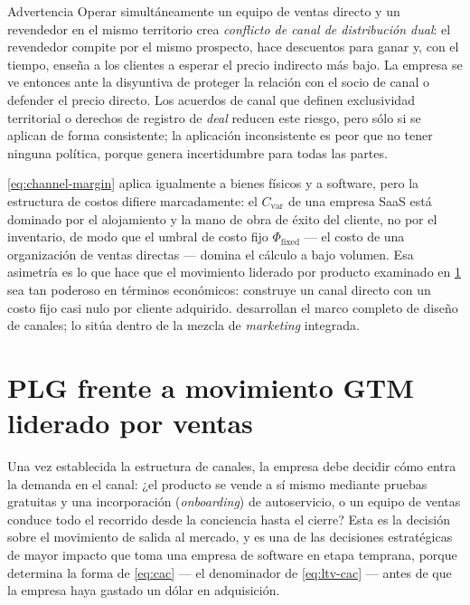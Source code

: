 \begin{admonition}{Advertencia}
Operar simultáneamente un equipo de ventas directo y un revendedor en el mismo territorio crea
\textit{conflicto de canal de distribución dual}: el revendedor compite por el mismo prospecto,
hace descuentos para ganar y, con el tiempo, enseña a los clientes a esperar el precio indirecto
más bajo. La empresa se ve entonces ante la disyuntiva de proteger la relación con el socio de
canal o defender el precio directo. Los acuerdos de canal que definen exclusividad territorial o
derechos de registro de \emph{deal} reducen este riesgo, pero sólo si se aplican de forma
consistente; la aplicación inconsistente es peor que no tener ninguna política, porque genera
incertidumbre para todas las partes.
\end{admonition}

\cref{eq:channel-margin} aplica igualmente a bienes físicos y a software, pero la estructura de
costos difiere marcadamente: el \(C_{\text{var}}\) de una empresa SaaS está dominado por el
alojamiento y la mano de obra de éxito del cliente, no por el inventario, de modo que el umbral
de costo fijo \(\Phi_{\text{fixed}}\) --- el costo de una organización de ventas directas ---
domina el cálculo a bajo volumen. Esa asimetría es lo que hace que el movimiento liderado por
producto examinado en \cref{sec:gtm-motion} sea tan poderoso en términos económicos: construye
un canal directo con un costo fijo casi nulo por cliente adquirido. \textcite{coughlan2006marketing}
desarrollan el marco completo de diseño de canales; \textcite{kotler2021} lo sitúa dentro de la
mezcla de \emph{marketing} integrada.


\section{PLG frente a movimiento GTM liderado por ventas}\label{sec:gtm-motion}

Una vez establecida la estructura de canales, la empresa debe decidir cómo entra la demanda en el
canal: ¿el producto se vende a sí mismo mediante pruebas gratuitas y una incorporación
(\emph{onboarding}) de autoservicio, o un equipo de ventas conduce todo el recorrido desde la
conciencia hasta el cierre? Esta es la decisión sobre el movimiento de salida al mercado, y es una
de las decisiones estratégicas de mayor impacto que toma una empresa de software en etapa temprana,
porque determina la forma de \cref{eq:cac} --- el denominador de \cref{eq:ltv-cac} --- antes de
que la empresa haya gastado un dólar en adquisición.

